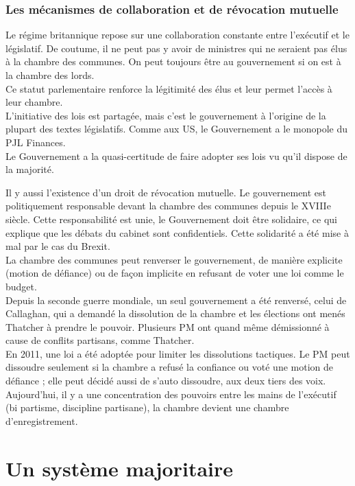 \documentclass[10pt, a4paper, openany]{book}
\begin{document}
\subsubsection{Les mécanismes de collaboration et de révocation mutuelle}

Le régime britannique repose sur une collaboration constante entre l'exécutif et le législatif. De coutume, il ne peut pas y avoir de ministres qui ne seraient pas élus à la chambre des communes. On peut toujours être au gouvernement si on est à la chambre des lords. \\
Ce statut parlementaire renforce la légitimité des élus et leur permet l'accès à leur chambre. \\
L'initiative des lois est partagée, mais c'est le gouvernement à l'origine de la plupart des textes législatifs. Comme aux US, le Gouvernement a le monopole du PJL Finances. \\
Le Gouvernement a la quasi-certitude de faire adopter ses lois vu qu'il dispose de la majorité.


Il y aussi l'existence d'un droit de révocation mutuelle. Le gouvernement est politiquement responsable devant la chambre des communes depuis le XVIIIe siècle. Cette responsabilité est unie, le Gouvernement doit être solidaire, ce qui explique que les débats du cabinet sont confidentiels. Cette solidarité a été mise à mal par le cas du Brexit. \\
La chambre des communes peut renverser le gouvernement, de manière explicite (motion de défiance) ou de façon implicite en refusant de voter une loi comme le budget. \\
Depuis la seconde guerre mondiale, un seul gouvernement a été renversé, celui de Callaghan, qui a demandé la dissolution de la chambre et les élections ont menés Thatcher à prendre le pouvoir. Plusieurs PM ont quand même démissionné à cause de conflits partisans, comme Thatcher. \\
En 2011, une loi a été adoptée pour limiter les dissolutions tactiques. Le PM peut dissoudre seulement si la chambre a refusé la confiance ou voté une motion de défiance ; elle peut décidé aussi de s'auto dissoudre, aux deux tiers des voix. \\
Aujourd'hui, il y a une concentration des pouvoirs entre les mains de l'exécutif (bi partisme, discipline partisane), la chambre devient une chambre d'enregistrement. 

\section{Un système majoritaire}
\end{document}
